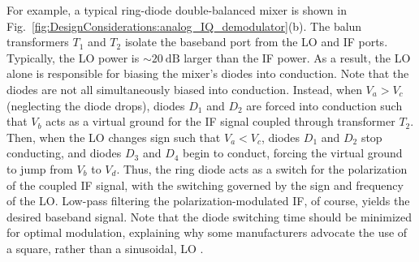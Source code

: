 For example, a typical ring-diode double-balanced mixer
is shown in Fig.~\ref{fig:DesignConsiderations:analog_IQ_demodulator}(b).
The balun transformers $T_1$ and $T_2$
isolate the baseband port from the LO and IF ports.
Typically, the LO power is $\sim \SI{20}{\deci\bel}$ larger than the IF power.
As a result, the LO alone is responsible
for biasing the mixer's diodes into conduction.
Note that the diodes are not all simultaneously biased into conduction.
Instead, when $V_a > V_c$ (neglecting the diode drops),
diodes $D_1$ and $D_2$ are forced into conduction such that
$V_b$ acts as a virtual ground for the IF signal
coupled through transformer $T_2$.
Then, when the LO changes sign such that $V_a < V_c$,
diodes $D_1$ and $D_2$ stop conducting, and
diodes $D_3$ and $D_4$ begin to conduct,
forcing the virtual ground to jump from $V_b$ to $V_d$.
Thus, the ring diode acts as a switch
for the polarization of the coupled IF signal,
with the switching governed by the sign and frequency of the LO.
Low-pass filtering the polarization-modulated IF, of course,
yields the desired baseband signal.
Note that the diode switching time should be minimized
for optimal modulation,
explaining why some manufacturers
advocate the use of a square, rather than a sinusoidal, LO
\cite{minicircuits_mixer_faqs}.

